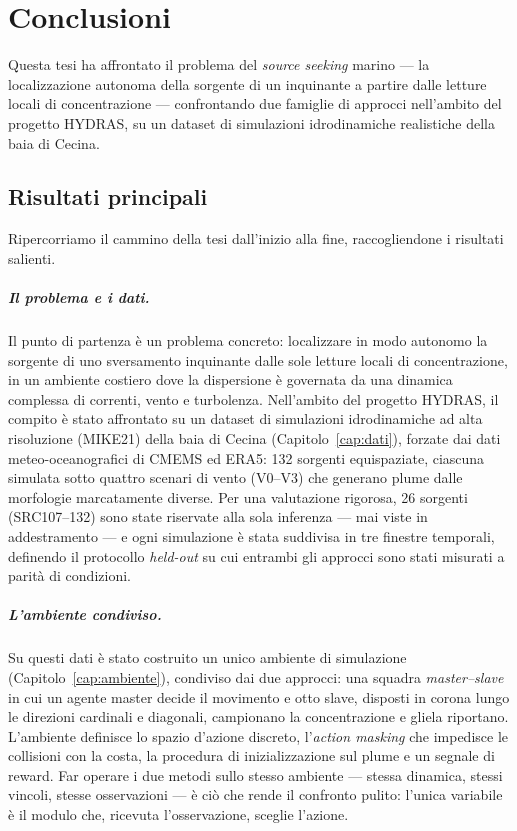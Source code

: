 \chapter{Conclusioni}
\label{cap:concl}

Questa tesi ha affrontato il problema del \emph{source seeking} marino --- la
localizzazione autonoma della sorgente di un inquinante a partire dalle letture locali
di concentrazione --- confrontando due famiglie di approcci nell'ambito del progetto
HYDRAS, su un dataset di simulazioni idrodinamiche realistiche della baia di Cecina.

\section{Risultati principali}

Ripercorriamo il cammino della tesi dall'inizio alla fine, raccogliendone i risultati
salienti.

\paragraph{Il problema e i dati.}
Il punto di partenza \`e un problema concreto: localizzare in modo autonomo la sorgente di
uno sversamento inquinante dalle sole letture locali di concentrazione, in un ambiente
costiero dove la dispersione \`e governata da una dinamica complessa di correnti, vento e
turbolenza. Nell'ambito del progetto HYDRAS, il compito \`e stato affrontato su un dataset
di simulazioni idrodinamiche ad alta risoluzione (MIKE21) della baia di Cecina
(Capitolo~\ref{cap:dati}), forzate dai dati meteo-oceanografici di CMEMS ed ERA5: 132
sorgenti equispaziate, ciascuna simulata sotto quattro scenari di vento (V0--V3) che
generano plume dalle morfologie marcatamente diverse. Per una valutazione rigorosa, 26
sorgenti (SRC107--132) sono state riservate alla sola inferenza --- mai viste in
addestramento --- e ogni simulazione \`e stata suddivisa in tre finestre temporali,
definendo il protocollo \emph{held-out} su cui entrambi gli approcci sono stati misurati a
parit\`a di condizioni.

\paragraph{L'ambiente condiviso.}
Su questi dati \`e stato costruito un unico ambiente di simulazione
(Capitolo~\ref{cap:ambiente}), condiviso dai due approcci: una squadra \emph{master--slave}
in cui un agente master decide il movimento e otto slave, disposti in corona lungo le
direzioni cardinali e diagonali, campionano la concentrazione e gliela riportano. L'ambiente
definisce lo spazio d'azione discreto, l'\emph{action masking} che impedisce le collisioni
con la costa, la procedura di inizializzazione sul plume e un segnale di reward. Far operare
i due metodi sullo stesso ambiente --- stessa dinamica, stessi vincoli, stesse osservazioni
--- \`e ci\`o che rende il confronto pulito: l'unica variabile \`e il modulo che, ricevuta
l'osservazione, sceglie l'azione.


